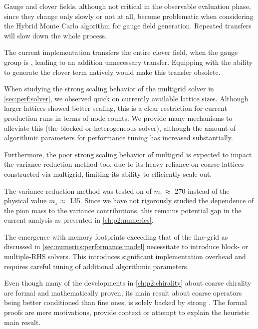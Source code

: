Gauge and clover fields, although not critical in the observable evaluation phase, since they change only slowly or not at all, become problematic when considering the Hybrid Monte Carlo algorithm for gauge field generation.
Repeated transfers will slow down the whole process.

The current implementation transfers the entire clover field, when the gauge group is , leading to an addition unnecessary transfer.
Equipping \quda with the ability to generate the  clover term natively would make this transfer obsolete.

When studying the strong scaling behavior of the multigrid solver in \cref{sec:perf:solver}, we observed quick  on currently available lattice sizes.
Although larger lattices showed better scaling, this is a clear restriction for current production runs in terms of node counts.
We provide many mechanisms to alleviate this (the blocked or heterogeneous solver), although the amount of algorithmic parameters for performance tuning has increased substantially.

Furthermore, the poor strong scaling behavior of multigrid is expected to impact the variance reduction method too, due to its heavy reliance on coarse lattices constructed via multigrid, limiting its ability to efficiently scale out.

The variance reduction method was tested on  of $m_{\pi} \approx $ \u{270}{\MeV} instead of the physical value $m_{\pi} \approx $ \u{135}{\MeV}.
Since we have not rigorously studied the dependence of the pion mass
to the variance contributions,
this remains potential gap in the current analysis as presented in \cref{ch:p2:numerics}.

The emergence  with memory footprints exceeding that of the fine-grid as discussed in \cref{sec:numerics:performance:model} necessitate to introduce block- or multiple-RHS solvers.
This introduces significant implementation overhead and requires careful tuning of additional algorithmic parameters.

Even though many of the developments in \cref{ch:p2:chirality} about coarse chirality are formal and mathematically proven, its main result about coarse operators being better conditioned than fine ones, is solely backed by strong .
The formal proofs are mere motivations, provide context or attempt to explain the heuristic main result.

